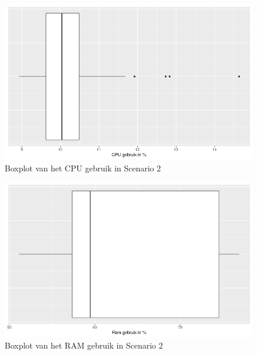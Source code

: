 %
\begin{figure}[h]
	\centering
	\includegraphics[width=0.75\linewidth]{img/SC2_CPUBox.png}
	\caption{Boxplot van het CPU gebruik in Scenario 2}
	\label{fig:SC2_CPUBox}
\end{figure}

\begin{figure}[h]
	\centering
	\includegraphics[width=0.75\linewidth]{img/SC2_RAMBox.png}
	\caption{Boxplot van het RAM gebruik in Scenario 2}
	\label{fig:SC2_RAMBox}
\end{figure}


